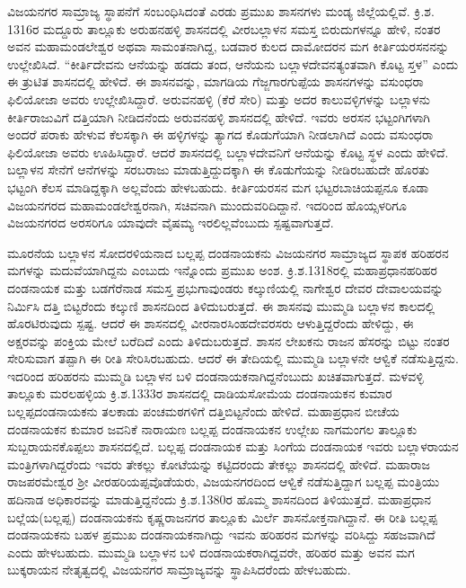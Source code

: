 ವಿಜಯನಗರ ಸಾಮ್ರಾಜ್ಯ ಸ್ಥಾಪನೆಗೆ ಸಂಬಂಧಿಸಿದಂತೆ ಎರಡು ಪ್ರಮುಖ ಶಾಸನಗಳು ಮಂಡ್ಯ ಜಿಲ್ಲೆಯಲ್ಲಿವೆ. ಕ್ರಿ.ಶ. 1316ರ ಮದ್ದೂರು ತಾಲ್ಲೂಕು ಅರುಹನಹಳ್ಳಿ ಶಾಸನದಲ್ಲಿ ವೀರಬಲ್ಲಾಳನ ಸಮಸ್ತ ಬಿರುದುಗಳನ್ನೂ ಹೇಳಿ, ನಂತರ ಅವನ ಮಹಾಮಂಡಲೇಶ್ವರ ಅಥವಾ ಸಾಮಂತನಾಗಿದ್ದ, ಬಡವಾರ ಕುಲದ ದಾಮೋದರನ ಮಗ ಕೀರ್ತಿಯರಸನನನ್ನು ಉಲ್ಲೇಖಿಸಿದೆ. “ಕೀರ್ತಿದೇವನು ಆನೆಯನ್ನು ಹಡದು ತಂದ, ಆನೆಯನು ಬಲ್ಲಾಳದೇವನತ್ಯಂತವಾಗಿ ಕೊಟ್ಟ ಸ್ತಳ” ಎಂದು ಈ ತ್ರುಟಿತ ಶಾಸನದಲ್ಲಿ ಹೇಳಿದೆ. ಈ ಶಾಸನವನ್ನು, ಮಾಗಡಿಯ ಗೆಜ್ಜಗಾರಗುಪ್ಪೆಯ ಶಾಸನಗಳನ್ನು ವಸುಂಧರಾ ಫಿಲಿಯೋಜಾ ಅವರು ಉಲ್ಲೇಖಿಸಿದ್ದಾರೆ. ಅರುವನಹಳ್ಳಿ (ಕೆರೆ ಸೇರಿ) ಮತ್ತು ಅದರ ಕಾಲುವಳ್ಳಿಗಳನ್ನು ಬಲ್ಲಾಳನು ಕೀರ್ತಿರಾಜುವಿಗೆ ದತ್ತಿಯಾಗಿ ನೀಡಿದನೆಂದು ಅರುವನಹಳ್ಳಿ ಶಾಸನದಲ್ಲಿ ಹೇಳಿದೆ. ಇವರು ಅರಸನ ಭಟ್ಟಂಗಿಗಳಾಗಿ ಅಂದರೆ ಪರಾಕು ಹೇಳುವ ಕೆಲಸಕ್ಕಾಗಿ ಈ ಹಳ್ಳಿಗಳನ್ನು ತ್ಯಾಗದ ಕೊಡುಗೆಯಾಗಿ ನೀಡಲಾಗಿದೆ ಎಂದು ವಸುಂಧರಾ ಫಿಲಿಯೋಜಾ ಅವರು ಊಹಿಸಿದ್ದಾರೆ. ಆದರೆ ಶಾಸನದಲ್ಲಿ ಬಲ್ಲಾಳದೇವನಿಗೆ ಆನೆಯನ್ನು ಕೊಟ್ಟ ಸ್ಥಳ ಎಂದು ಹೇಳಿದೆ. ಬಲ್ಲಾಳನ ಸೇನೆಗೆ ಆನೆಗಳನ್ನು ಸರಬರಾಜು ಮಾಡುತ್ತಿದ್ದುದಕ್ಕಾಗಿ ಈ ಕೊಡುಗೆಯನ್ನು ನೀಡಿರಬಹುದೇ ಹೊರತು ಭಟ್ಟಂಗಿ ಕೆಲಸ ಮಾಡಿದ್ದಕ್ಕಾಗಿ ಅಲ್ಲವೆಂದು ಹೇಳಬಹುದು. ಕೀರ್ತಿಯರಸನ ಮಗ ಭಟ್ಟರಬಾಚಿಯಪ್ಪನೂ ಕೂಡಾ ವಿಜಯನಗರದ ಮಹಾಮಂಡಲೇಶ್ವರನಾಗಿ, ಸಚಿವನಾಗಿ ಮುಂದುವರಿದಿದ್ದಾನೆ. ಇದರಿಂದ ಹೊಯ್ಸಳರಿಗೂ ವಿಜಯನಗರದ ಅರಸರಿಗೂ ಯಾವುದೇ ವೈಷಮ್ಯ ಇರಲಿಲ್ಲವೆಂಬುದು ಸ್ಪಷ್ಟವಾಗುತ್ತದೆ.

ಮೂರನೆಯ ಬಲ್ಲಾಳನ ಸೋದರಳಿಯನಾದ ಬಲ್ಲಪ್ಪ ದಂಡನಾಯಕನು ವಿಜಯನಗರ ಸಾಮ್ರಾಜ್ಯದ ಸ್ಥಾಪಕ ಹರಿಹರನ ಮಗಳನ್ನು ಮದುವೆಯಾಗಿದ್ದನು ಎಂಬುದು ಇನ್ನೊಂದು ಪ್ರಮುಖ ಅಂಶ. ಕ್ರಿ.ಶ.1318ರಲ್ಲಿ ಮಹಾಪ್ರಧಾನ\break ಹರಿಹರ ದಂಡನಾಯಕ ಮತ್ತು ಬಡಗೆರೆನಾಡ ಸಮಸ್ತ ಪ್ರಭುಗಾವುಂಡರು ಕಲ್ಕುಣಿಯಲ್ಲಿ ನಾಗೇಶ್ವರ ದೇವರ ದೇವಾಲಯವನ್ನು ನಿರ್ಮಿಸಿ ದತ್ತಿ ಬಿಟ್ಟರೆಂದು ಕಲ್ಕುಣಿ ಶಾಸನದಿಂದ ತಿಳಿದುಬರುತ್ತದೆ. ಈ ಶಾಸನವು ಮುಮ್ಮಡಿ ಬಲ್ಲಾಳನ ಕಾಲದಲ್ಲಿ ಹೊರಟಿರುವುದು ಸ್ಪಷ್ಟ. ಆದರೆ ಈ ಶಾಸನದಲ್ಲಿ ವೀರನಾರಸಿಂಹದೇವರಸರು ಆಳುತ್ತಿದ್ದರೆಂದು ಹೇಳಿದ್ದು, ಈ ಅಕ್ಷರವನ್ನು ಪಂಕ್ತಿಯ ಮೇಲೆ ಬರೆದಿದೆ ಎಂದು ತಿಳಿದುಬರುತ್ತದೆ. ಶಾಸನ ಲೇಖಕನು ರಾಜನ ಹೆಸರನ್ನು ಬಿಟ್ಟು ನಂತರ ಸೇರಿಸುವಾಗ ತಪ್ಪಾಗಿ ಈ ರೀತಿ ಸೇರಿಸಿರಬಹುದು. ಆದರೆ ಈ ತೇದಿಯಲ್ಲಿ ಮುಮ್ಮಡಿ ಬಲ್ಲಾಳನೇ ಆಳ್ವಿಕೆ ನಡೆಸುತ್ತಿದ್ದನು. ಇದರಿಂದ ಹರಿಹರನು ಮುಮ್ಮಡಿ ಬಲ್ಲಾಳನ ಬಳಿ ದಂಡನಾಯಕನಾಗಿದ್ದನೆಂಬುದು ಖಚಿತವಾಗುತ್ತದೆ. ಮಳವಳ್ಳಿ ತಾಲ್ಲೂಕು ಮರಲಹಳ್ಳಿಯ ಕ್ರಿ.ಶ.1333ರ ಶಾಸನದಲ್ಲಿ ದಾಡಿಯಸೋಮೆಯ ದಂಡನಾಯಕನ ಕುಮಾರ ಬಲ್ಲಪ್ಪದಂಡನಾಯಕನು ತಲಕಾಡು ಪಂಚಮಠಗಳಿಗೆ ದತ್ತಿಬಿಟ್ಟ\-ನೆಂದು ಹೇಳಿದೆ. ಮಹಾಪ್ರಧಾನ ಬೀಚೆಯ ದಂಡನಾಯಕನ ಕುಮಾರ ಜವನಿಕೆ ನಾರಾಯಣ ಬಲ್ಲಪ್ಪ ದಂಡನಾಯಕನ ಉಲ್ಲೇಖ ನಾಗಮಂಗಲ ತಾಲ್ಲೂಕು ಸುಬ್ಬರಾಯನಕೊಪ್ಪಲು ಶಾಸನದಲ್ಲಿದೆ. ಬಲ್ಲಪ್ಪ ದಂಡನಾಯಕ ಮತ್ತು ಸಿಂಗೆಯ ದಂಡನಾಯಕ ಇವರು ಬಲ್ಲಾಳರಾಯನ ಮಂತ್ರಿಗಳಾಗಿದ್ದರೆಂದು ಇವರು ತೇಕಲ್ಲು ಕೋಟೆಯನ್ನು ಕಟ್ಟಿದರಂದು ತೇಕಲ್ಲು ಶಾಸನದಲ್ಲಿ ಹೇಳಿದೆ. ಮಹಾರಾಜ ರಾಜಪರಮೇಶ್ವರ ಶ‍್ರೀ ವೀರಹರಿಯಪ್ಪವೊಡೆಯರು, ವಿಜಯನಗರದಿಂದ ಆಳ್ವಿಕೆ ನಡೆಸುತ್ತಿದ್ದಾಗ ಬಲ್ಲಪ್ಪ ಮಂತ್ರಿಯು ಹದಿನಾಡ ಅಧಿಕಾರವನ್ನು ಮಾಡುತ್ತಿದ್ದನೆಂದು ಕ್ರಿ.ಶ.1380ರ ಹೊಮ್ಮ ಶಾಸನದಿಂದ ತಿಳಿಯುತ್ತದೆ. ಮಹಾಪ್ರಧಾನ ಬಲ್ಲೆಯ(ಬಲ್ಲಪ್ಪ) ದಂಡನಾಯಕನು ಕೃಷ್ಣರಾಜನಗರ ತಾಲ್ಲೂಕು ಮಿರ್ಲೆ ಶಾಸನೋಕ್ತನಾಗಿ\-ದ್ದಾನೆ. ಈ ರೀತಿ ಬಲ್ಲಪ್ಪ ದಂಡನಾಯಕನು ಬಹಳ ಪ್ರಮುಖ ದಂಡನಾಯಕನಾಗಿದ್ದು ಇವನು ಹರಿಹರನ ಮಗಳನ್ನು ವರಿಸಿದ್ದು ಸಹಜವಾಗಿದೆ ಎಂದು ಹೇಳಬಹುದು. ಮುಮ್ಮಡಿ ಬಲ್ಲಾಳನ ಬಳಿ ದಂಡನಾಯಕರಾಗಿದ್ದವರೇ, ಹರಿಹರ ಮತ್ತು ಅವನ ಮಗ ಬುಕ್ಕರಾಯನ ನೇತೃತ್ವದಲ್ಲಿ ವಿಜಯನಗರ ಸಾಮ್ರಾಜ್ಯವನ್ನು ಸ್ಥಾಪಿಸಿದರೆಂದು ಹೇಳಬಹುದು.

